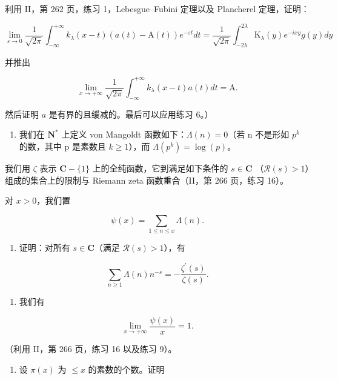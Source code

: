 利用 II，第 262 页，练习 1，Lebesgue–Fubini 定理以及 Plancherel 定理，证明：

\[
\lim _ {\varepsilon \to 0} \frac {1}{\sqrt {2 \pi}} \int_ {- \infty} ^ {+ \infty} k _ {\lambda} (x - t) (a (t) - \mathrm{A} (t)) e ^ {- \varepsilon t} d t = \frac {1}{\sqrt {2 \pi}} \int_ {- 2 \lambda} ^ {2 \lambda} \mathrm{K} _ {\lambda} (y) e ^ {- i x y} g (y) d y
\]

并推出

\[
\lim _ {x \to + \infty} \frac {1}{\sqrt {2 \pi}} \int_ {- \infty} ^ {+ \infty} k _ {\lambda} (x - t) a (t) d t = \mathrm{A}.
\]

然后证明 \(a\) 是有界的且缓减的。最后可以应用练习 6。）

\begin{enumerate}
\def\labelenumi{\arabic{enumi})}
\setcounter{enumi}{9}
\tightlist
\item
  我们在 \(\mathbf{N}^{*}\) 上定义 von Mangoldt 函数如下：\(\Lambda(n)=0\)（若 n 不是形如 \(p^{k}\) 的数，其中 p 是素数且 \(k\geqslant1\)），而 \(\Lambda(p^{k})=\log(p)\)。
\end{enumerate}

我们用 \(\zeta\) 表示 \(\mathbf{C} - \{1\}\) 上的全纯函数，它到满足如下条件的 \(s \in \mathbf{C}\) （\(\mathcal{R}(s) > 1\)）组成的集合上的限制与 Riemann zeta 函数重合（II，第 266 页，练习 16）。

对 \(x > 0\)，我们置

\[
\psi (x) = \sum_ {1 \leqslant n \leqslant x} \Lambda (n).
\]

\begin{enumerate}
\def\labelenumi{\alph{enumi})}
\tightlist
\item
  证明：对所有 \(s \in \mathbf{C}\)（满足 \(\mathcal{R}(s) > 1\)），有
\end{enumerate}

\[
\sum_ {n \geqslant 1} \Lambda (n) n ^ {- s} = - \frac {\zeta^ {\prime} (s)}{\zeta (s)}.
\]

\begin{enumerate}
\def\labelenumi{\alph{enumi})}
\setcounter{enumi}{1}
\tightlist
\item
  我们有
\end{enumerate}

\[
\lim _ {x \to + \infty} \frac {\psi (x)}{x} = 1.
\]

（利用 II，第 266 页，练习 16 以及练习 9）。

\begin{enumerate}
\def\labelenumi{\alph{enumi})}
\setcounter{enumi}{2}
\tightlist
\item
  设 \(\pi(x)\) 为 \(\leqslant x\) 的素数的个数。证明
\end{enumerate}

